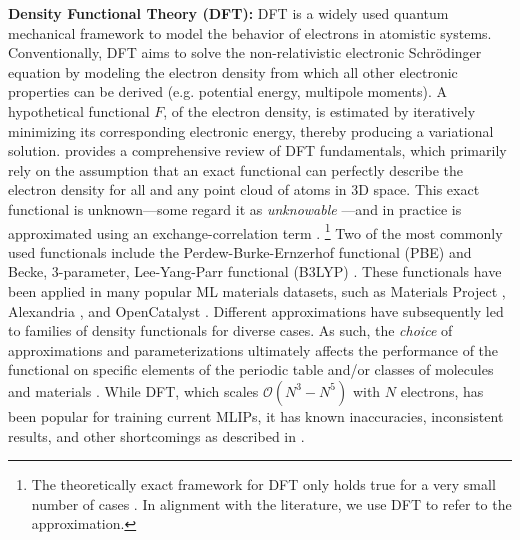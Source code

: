 \textbf{Density Functional Theory (DFT):} DFT  is a widely used quantum mechanical framework to model the behavior of electrons in atomistic systems. Conventionally, DFT aims to solve the non-relativistic electronic Schr\"{o}dinger equation by modeling the electron density from which all other electronic properties can be derived (e.g. potential energy, multipole moments). A hypothetical functional $F$, of the electron density, is estimated by iteratively minimizing its corresponding electronic energy, thereby producing a variational solution. \citet{jonesDensityFunctionalTheory2015} provides a comprehensive review of DFT fundamentals, which primarily rely on the assumption that an exact functional can perfectly describe the electron density for all and any point cloud of atoms in 3D space.  This exact functional is unknown---some regard it as \emph{unknowable} \citep{schuch2009computational}---and in practice is approximated using an exchange-correlation term \citep{kohn1965self}. \footnote{The theoretically exact framework for DFT only holds true for a very small number of cases \citep{mayerConceptualProblemCalculating2017}. In alignment with the literature, we use DFT to refer to the approximation.} Two of the most commonly used functionals include the Perdew-Burke-Ernzerhof functional (PBE) \citep{perdew1996generalized} and Becke, 3-parameter, Lee-Yang-Parr functional (B3LYP) \citep{leeDevelopmentColleSalvettiCorrelationenergy1988,beckeDensityfunctionalExchangeenergyApproximation1988}. These functionals have been applied in many popular ML materials datasets, such as Materials Project \citep{jain2013commentary}, Alexandria \citep{schmidt2024improving}, and OpenCatalyst \citep{chanussot2021open}. Different approximations have subsequently led to families of density functionals for diverse cases. As such, the \emph{choice} of approximations and parameterizations ultimately affects the performance of the functional on specific elements of the periodic table and/or classes of molecules and materials \citep{apra2020nwchem, kuhne2020cp2k, giannozzi2009quantum}. While DFT, which scales $\mathcal{O}(N^3-N^5)$ with $N$ electrons, has been popular for training current MLIPs, it has known inaccuracies, inconsistent results, and other shortcomings as described in .


